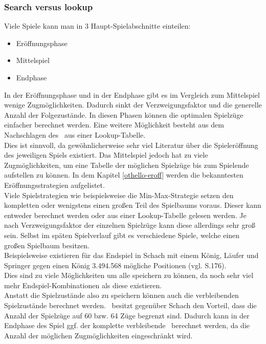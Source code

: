 \subsubsection{Search versus lookup}
Viele Spiele kann man in 3 Haupt-Spielabschnitte einteilen:
\begin{itemize}
\item Eröffnungsphase
\item Mittelspiel
\item Endphase
\end{itemize}
In der Eröffnungsphase und in der Endphase gibt es im Vergleich zum Mittelspiel wenige Zugmöglichkeiten. Dadurch sinkt der Verzweigungsfaktor und die generelle Anzahl der Folgezustände. In diesen Phasen können die optimalen Spielzüge einfacher berechnet werden. Eine weitere Möglichkeit besteht aus dem Nachschlagen des \states\ aus einer Lookup-Tabelle.
\\Dies ist sinnvoll, da gewöhnlicherweise sehr viel Literatur über die Spieleröffnung des jeweiligen Spiels existiert.%
Das Mittelspiel jedoch hat zu viele Zugmöglichkeiten, um eine Tabelle der möglichen Spielzüge bis zum Spielende aufstellen zu können. In dem Kapitel \ref{othello-eroff} werden die bekanntesten Eröffnungsstrategien aufgelistet.
\\Viele Spielstrategien wie beispielsweise die Min-Max-Strategie setzen den kompletten oder wenigstens einen großen Teil des Spielbaums voraus. Dieser kann entweder berechnet werden oder aus einer Lookup-Tabelle gelesen werden. Je nach Verzweigungsfaktor der einzelnen Spielzüge kann diese allerdings sehr groß sein. Selbst im späten Spielverlauf gibt es verschiedene Spiele, welche einen großen Spielbaum besitzen.
\\Beispielsweise existieren für das Endspiel in Schach mit einem König, Läufer und Springer gegen einen König 3.494.568 mögliche Positionen (vgl. \cite{Russell.2016} S.176).
\\Dies sind zu viele Möglichkeiten um alle speichern zu können, da noch sehr viel mehr Endspiel-Kombinationen als diese existieren.
\\Anstatt die Spielzustände also zu speichern können auch die verbleibenden Spielzustände berechnet werden. \ot\ besitzt gegenüber Schach den Vorteil, dass die Anzahl der Spielzüge auf 60 bzw. 64 Züge begrenzt sind. Dadurch kann in der Endphase des Spiel ggf. der komplette verbleibende \gtree\ berechnet werden, da die Anzahl der möglichen Zugmöglichkeiten eingeschränkt wird.
